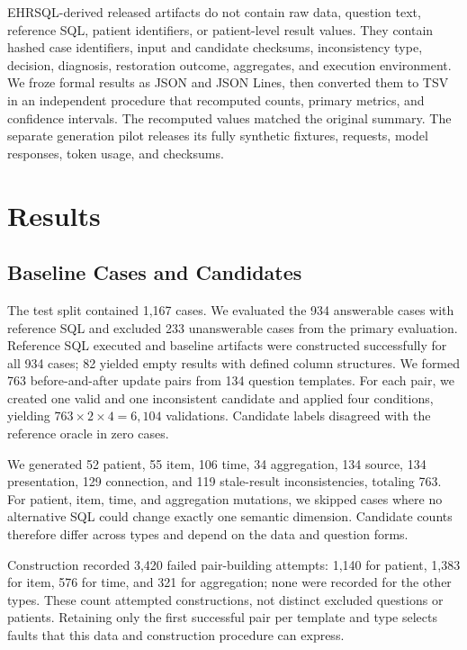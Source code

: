 \documentclass[manuscript,review,anonymous]{acmart}
\begin{document}
EHRSQL-derived released artifacts do not contain raw data, question text, reference SQL, patient identifiers, or patient-level result values. They contain hashed case identifiers, input and candidate checksums, inconsistency type, decision, diagnosis, restoration outcome, aggregates, and execution environment. We froze formal results as JSON and JSON Lines, then converted them to TSV in an independent procedure that recomputed counts, primary metrics, and confidence intervals. The recomputed values matched the original summary. The separate generation pilot releases its fully synthetic fixtures, requests, model responses, token usage, and checksums.

\section{Results}

\subsection{Baseline Cases and Candidates}

The test split contained 1,167 cases. We evaluated the 934 answerable cases with reference SQL and excluded 233 unanswerable cases from the primary evaluation. Reference SQL executed and baseline artifacts were constructed successfully for all 934 cases; 82 yielded empty results with defined column structures. We formed 763 before-and-after update pairs from 134 question templates. For each pair, we created one valid and one inconsistent candidate and applied four conditions, yielding $763\times2\times4=6{,}104$ validations. Candidate labels disagreed with the reference oracle in zero cases.

We generated 52 patient, 55 item, 106 time, 34 aggregation, 134 source, 134 presentation, 129 connection, and 119 stale-result inconsistencies, totaling 763. For patient, item, time, and aggregation mutations, we skipped cases where no alternative SQL could change exactly one semantic dimension. Candidate counts therefore differ across types and depend on the data and question forms.

Construction recorded 3,420 failed pair-building attempts: 1,140 for patient, 1,383 for item, 576 for time, and 321 for aggregation; none were recorded for the other types. These count attempted constructions, not distinct excluded questions or patients. Retaining only the first successful pair per template and type selects faults that this data and construction procedure can express.
\end{document}
